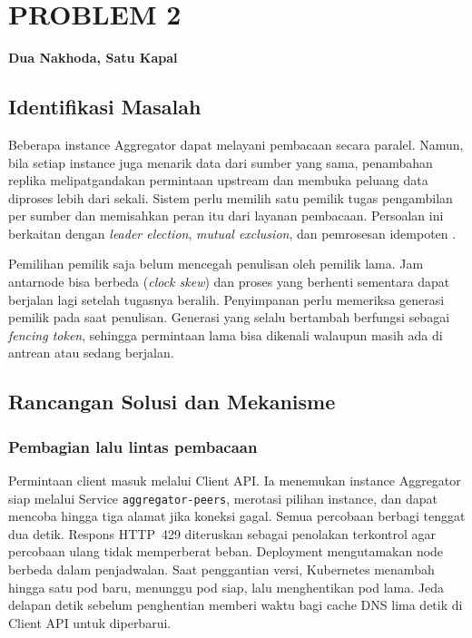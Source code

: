 \chapter{PROBLEM 2}
\label{ch:p2}

\begin{center}\large\bfseries Dua Nakhoda, Satu Kapal\end{center}

\section{Identifikasi Masalah}

Beberapa instance Aggregator dapat melayani pembacaan secara paralel. Namun, bila setiap instance juga menarik data dari sumber yang sama, penambahan replika melipatgandakan permintaan upstream dan membuka peluang data diproses lebih dari sekali. Sistem perlu memilih satu pemilik tugas pengambilan per sumber dan memisahkan peran itu dari layanan pembacaan. Persoalan ini berkaitan dengan \emph{leader election}, \emph{mutual exclusion}, dan pemrosesan idempoten \cite{kleppmann2017}.

Pemilihan pemilik saja belum mencegah penulisan oleh pemilik lama. Jam antarnode bisa berbeda (\emph{clock skew}) dan proses yang berhenti sementara dapat berjalan lagi setelah tugasnya beralih. Penyimpanan perlu memeriksa generasi pemilik pada saat penulisan. Generasi yang selalu bertambah berfungsi sebagai \emph{fencing token}, sehingga permintaan lama bisa dikenali walaupun masih ada di antrean atau sedang berjalan.

\section{Rancangan Solusi dan Mekanisme}

\subsection{Pembagian lalu lintas pembacaan}

Permintaan client masuk melalui Client API. Ia menemukan instance Aggregator siap melalui Service \texttt{aggregator-peers}, merotasi pilihan instance, dan dapat mencoba hingga tiga alamat jika koneksi gagal. Semua percobaan berbagi tenggat dua detik. Respons HTTP~429 diteruskan sebagai penolakan terkontrol agar percobaan ulang tidak memperberat beban. Deployment mengutamakan node berbeda dalam penjadwalan. Saat penggantian versi, Kubernetes menambah hingga satu pod baru, menunggu pod siap, lalu menghentikan pod lama. Jeda delapan detik sebelum penghentian memberi waktu bagi cache DNS lima detik di Client API untuk diperbarui.

